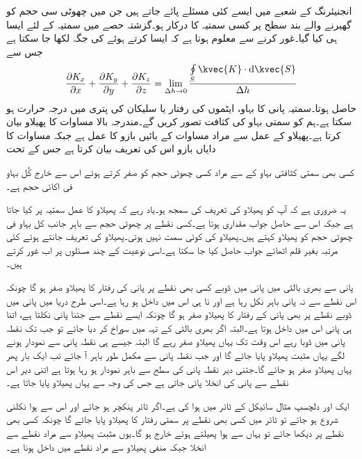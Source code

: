 انجنیئرنگ  کے شعبے میں ایسے کئی مسئلے پائے جاتے ہیں جن  میں چھوٹی سی حجم  کو گھیرنے والے بند سطح پر کسی سمتیہ  کا   درکار ہو۔گزشتہ حصے میں سمتیہ  کے لئے ایسا ہی کیا گیا۔غور کرنے سے معلوم ہوتا ہے کہ ایسا کرتے ہوئے   کی جگہ  لکھا جا سکتا ہے جس سے 
\begin{align}\label{مساوات_گاوس_کارتیسی_پھیلاو_کی_تعریف}
\frac{\partial K_x}{\partial x}+\frac{\partial K_y}{\partial y}+\frac{\partial K_z}{\partial z}=\lim_{\Delta h \to 0}\frac{\oint\limits_{S}\kvec{K}\cdot \dif \kvec{S}}{\Delta h}
\end{align}
حاصل ہوتا۔سمتیہ  پانی کا بہاو، ایٹموں کی رفتار یا سلیکان کی پتری میں درجہ حرارت ہو سکتا ہے۔ہم  کو سمتی بہاو کی کثافت تصور کریں گے۔مندرجہ بالا مساوات   کا پھیلاو بیان کرتا ہے۔پھیلاو کے عمل سے مراد مساوات کے بائیں بازو کا عمل ہے  جبکہ مساوات کا دایاں بازو اس کی تعریف بیان کرتا ہے جس کے تحت

کسی بھی سمتی کثافتی بہاو کے  سے مراد کسی  چھوٹی حجم کو صفر کرتے ہوئے اس  سے خارج کُل بہاو فی اکائی حجم ہے۔ 

یہ ضروری ہے کہ آپ کو پھیلاو کی تعریف کی سمجھ ہو۔یاد رہے کہ پھیلاو کا عمل سمتیہ پر کیا جاتا ہے جبکہ اس سے حاصل جواب مقداری ہوتا ہے۔کسی نقطے پر چھوٹی حجم سے باہر جانب کل بہاو فی چھوٹی حجم کو پھیلاو کہتے ہیں۔پھیلاو کی کوئی سمت نہیں ہوتی۔پھیلاو کی تعریف جانتے ہوئے کئی مرتبہ بغیر قلم اٹھائے جواب حاصل کیا جا سکتا ہے۔اسی نوعیت کے چند مسئلوں پر اب غور کرتے ہیں۔

پانی سے بھری بالٹی میں پانی میں ڈوبے کسی بھی نقطے پر پانی کی رفتار کا پھیلاو صفر ہو گا چونکہ اس نقطے سے نہ پانی باہر نکل رہا ہے اور نا ہی اس میں داخل ہو رہا ہے۔اسی طرح دریا میں پانی میں ڈوبے نقطے پر بھی پانی کے رفتار کا پھیلاو صفر ہو گا چونکہ ایسے نقطے سے جتنا پانی نکلتا ہے، اتنا ہی پانی اس میں داخل ہوتا ہے۔البتہ اگر بھری بالٹی کے تہہ میں سوراخ کر دیا جائے  تو جب تک نقطہ پانی میں ڈوبا رہے اس وقت تک یہاں پھیلاو صفر رہے  گا البتہ جیسے ہی نقطہ پانی سے نمودار ہونے لگے یہاں مثبت پھیلاو پایا جائے گا اور جب نقطہ پانی سے مکمل طور باہر آ جائے تب ایک بار پھر یہاں پھیلاو صفر ہو جائے گا۔جتنی دیر نقطہ پانی کی سطح سے باہر نمودار ہو رہا ہوتا ہے اتنی دیر اس نقطے سے پانی کی انخلا پائی جاتی ہے جس کی وجہ سے یہاں پھیلاو پایا جاتا ہے۔

ایک اور دلچسپ مثال سائیکل کے ٹائر میں ہوا کی ہے۔اگر ٹائر پنکچر ہو جائے اور اس سے ہوا نکلنی شروع ہو جائے تو ٹائر میں کسی بھی نقطے پر سمتی رفتار کا پھیلاو پایا جائے گا چونکہ کسی بھی نقطے پر دیکھا جائے تو یہاں سے ہوا پھیلتے ہوئے خارج ہو گا۔یوں مثبت پھیلاو سے مراد نقطے سے انخلا جبکہ منفی پھیلاو سے مراد نقطے میں داخل ہونا ہے۔ 

